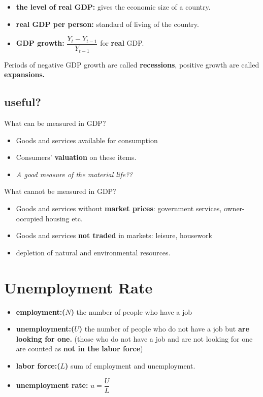 \documentclass[11pt, a4paper]{ECON2123}
\begin{document}
\begin{spacing}{1.5}
    \begin{itemize}
        \item {\bf the level of real GDP:} gives the economic 
        size of a country.
        \item {\bf real GDP per person:} standard of living of the country.
        \item {\bf GDP growth:} $\dfrac{Y_t-Y_{t-1}}{Y_{t-1}}$ for {\bf real} GDP.
    \end{itemize}

    Periods of negative GDP growth are called {\bf recessions},
    positive growth are called {\bf expansions.}

    
    \subsection{useful?}

    What can be measured in GDP?
    \begin{itemize}
        \item Goods and services available for consumption
        \item Consumers' {\bf valuation} on these items.
        \item {\it A good measure of the material life??}
    \end{itemize}

    What cannot be measured in GDP?
    \begin{itemize}
        \item Goods and services without {\bf market prices}:
        government services, owner-occupied housing etc.
        \item Goods and services {\bf not traded} in markets:
        leisure, housework
        \item depletion of natural and environmental resources.
    \end{itemize}

    \section{Unemployment Rate}

    \begin{itemize}
        \item {\bf employment:($N$) } the number of people who have a job
        \item {\bf unemployment:($U$) } the number of people who do not 
        have a job but {\bf are looking for one.} (those who do not have a 
        job and are not looking for one are counted as {\bf not in the labor force})
        \item {\bf labor force:($L$) } sum of employment and unemployment.
        \item {\bf unemployment rate: } $u=\dfrac{U}{L}$
    \end{itemize}


\end{spacing}
\end{document}
